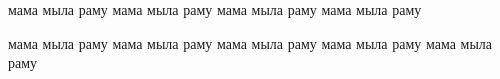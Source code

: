 \begin{center}
\WorkType

\Topic
\end{center}

мама мыла раму
мама мыла раму
мама мыла раму
мама мыла раму

                   мама                      мыла раму
мама мыла раму
										мама мыла раму
мама 					мыла раму
мама мыла раму

